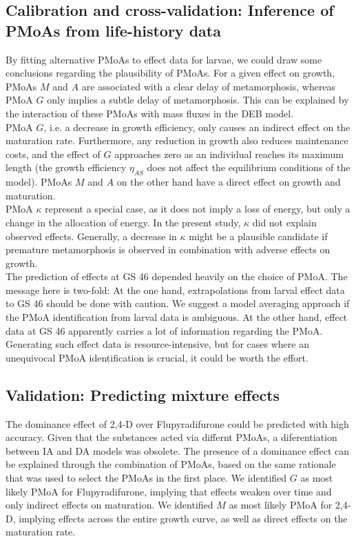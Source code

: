 \documentclass[preprint,12pt]{elsarticle}
\begin{document}
\subsection{Calibration and cross-validation: Inference of PMoAs from life-history data}
\noindent
By fitting alternative PMoAs to effect data for larvae, 
we could draw some conclusions regarding the plausibility of PMoAs. 
For a given effect on growth, 
PMoAs $M$ and $A$ are associated with a clear delay of metamorphosis, 
whereas PMoA $G$ only implies a subtle delay of metamorphosis. 
This can be explained by the interaction of these PMoAs with mass fluxes in the DEB model.\\
PMoA $G$, i.e. a decrease in growth efficiency, 
only causes an indirect effect on the maturation rate.
Furthermore, any reduction in growth also reduces maintenance costs, 
and the effect of $G$ approaches zero as an individual reaches its maximum length 
(the growth efficiency $\eta_{AS}$ does not affect the equilibrium conditions of the model).
PMoAs $M$ and $A$ on the other hand have a direct effect on growth and maturation.\\
PMoA $\kappa$ represent a special case, as it does not imply a loss of energy, 
but only a change in the allocation of energy. 
In the present study, $\kappa$ did not explain observed effects. 
Generally, a decrease in $\kappa$ might be a plausible candidate if premature metamorphosis is observed 
in combination with adverse effects on growth.\\
The prediction of effects at GS 46 depended heavily on the choice of PMoA. 
The message here is two-fold: 
At the one hand, extrapolations from larval effect data to GS 46 should be done with caution. 
We suggest a model averaging approach if the PMoA identification from larval data is ambiguous.
At the other hand, effect data at GS 46 apparently carries a lot of information regarding the PMoA. 
Generating such effect data is resource-intensive, but for cases where an unequivocal PMoA identification is crucial, 
it could be worth the effort. 
%
\subsection{Validation: Predicting mixture effects}
\noindent
The dominance effect of 2,4-D over Flupyradifurone could be predicted with high accuracy. 
Given that the substances acted via differnt PMoAs, a diferentiation between IA and DA models was obsolete. 
The presence of a dominance effect can be explained through the combination of PMoAs, 
based on the same rationale that was used to select the PMoAs in the first place. 
We identified $G$ as most likely PMoA for Flupyradifurone, 
implying that effects weaken over time and only indirect effects on maturation. 
We identified $M$ as most likely PMoA for 2,4-D, 
implying effects across the entire growth curve, as well as direct effects on the maturation rate. 
%
\end{document}
